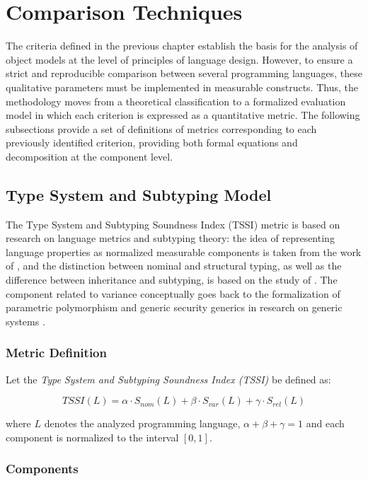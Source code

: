 \section{Comparison Techniques}

The criteria defined in the previous chapter establish the basis for the analysis of object models at the level of principles of language design. However, to ensure a strict and reproducible comparison between several programming languages, these qualitative parameters must be implemented in measurable constructs. Thus, the methodology moves from a theoretical classification to a formalized evaluation model in which each criterion is expressed as a quantitative metric. The following subsections provide a set of definitions of metrics corresponding to each previously identified criterion, providing both formal equations and decomposition at the component level.

\subsection{Type System and Subtyping Model}

The Type System and Subtyping Soundness Index (TSSI) metric is based on research on language metrics and subtyping theory: the idea of representing language properties as normalized measurable components is taken from the work of \cite{fayzrakhmanov2022introducing}, and the distinction between nominal and structural typing, as well as the difference between inheritance and subtyping, is based on the study of \cite{cardelli1985understanding}. The component related to variance conceptually goes back to the formalization of parametric polymorphism and generic security generics in research on generic systems \cite{pierce2002types}.

\subsubsection{Metric Definition}

Let the \textit{Type System and Subtyping Soundness Index (TSSI)} be defined as:

\[
    TSSI(L) = 
    \alpha \cdot S_{nom}(L) + 
    \beta \cdot S_{var}(L) + 
    \gamma \cdot S_{rel}(L)
\]

where $L$ denotes the analyzed programming language, $\alpha + \beta + \gamma = 1$ and each component is normalized to the interval $[0,1]$.

\subsubsection{Components}

